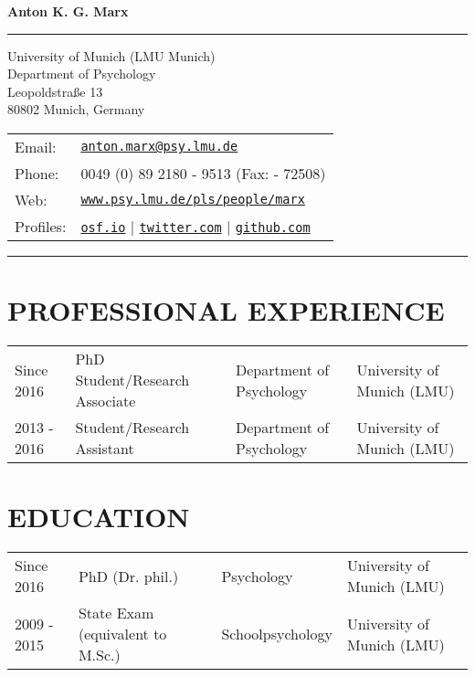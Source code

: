 \documentclass[letterpaper]{article}
\def\name{Anton K. G. Marx} %
\begin{document}
{\Huge \bf \name}

\vspace{0.1in}

\noindent\rule{\textwidth}{0.5pt} %

\vspace{0.1in}

\begin{minipage}{0.45\linewidth}
  University of Munich (LMU Munich) \\
  Department of Psychology \\
  Leopoldstraße 13 \\ 
  80802 Munich, Germany
\end{minipage}
\begin{minipage}{1.45\linewidth}
  \begin{tabular}{ll}
    Email: & \href{mailto:anton.marx@psy.lmu.de}{\tt anton.marx@psy.lmu.de} \\
    Phone: & 0049 (0) 89  2180 - 9513 (Fax: - 72508)\\
    Web: & \href{https://www.psy.lmu.de/pls/people/marx/}{\tt www.psy.lmu.de/pls/people/marx} \\
    Profiles: & \href{https://www.osf.io/z7rfu/}{\tt osf.io} | \href{https://www.twitter.com/mrxntn/}{\tt twitter.com} | \href{https://www.github.com/mrxntn/}{\tt github.com}
      \end{tabular}
\end{minipage}

\vspace{0.1in}

\noindent\rule{\textwidth}{0.5pt} %


\section*{PROFESSIONAL EXPERIENCE}
  \begin{tabular}{llll}
    Since 2016 & PhD Student/Research Associate & Department of Psychology & University of Munich (LMU)\\
    2013 - 2016 & Student/Research Assistant & Department of Psychology & University of Munich (LMU)\\
      \end{tabular}

\section*{EDUCATION}
  \begin{tabular}{llll}
    Since 2016 & PhD (Dr. phil.) & Psychology & University of Munich (LMU)\\
    2009 - 2015 & State Exam (equivalent to M.Sc.) & Schoolpsychology & University of Munich (LMU)\\
      \end{tabular}
\end{document}
